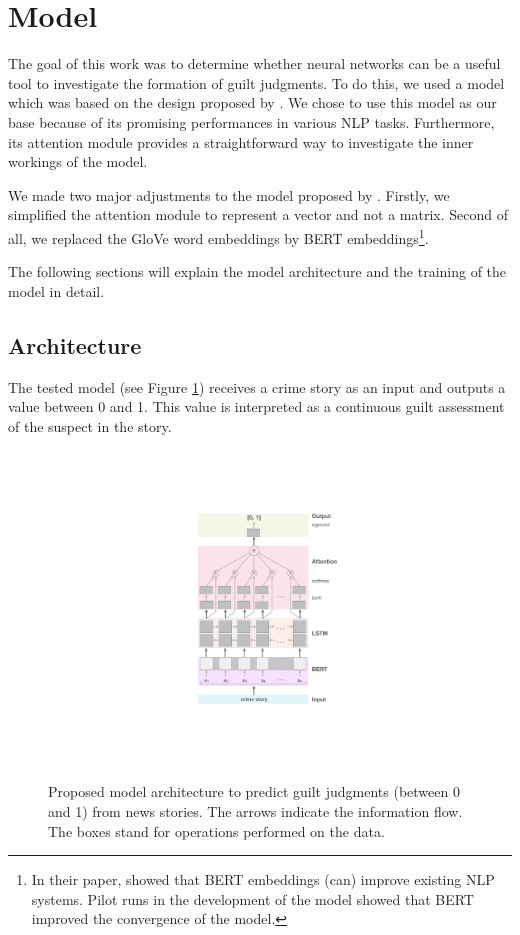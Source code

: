 \documentclass[11pt,a4paper]{article}
\begin{document}
\section{Model}

The goal of this work was to determine whether neural networks can be a useful tool to investigate the formation of guilt judgments. To do this, we used a model which was based on the design proposed by \citeauthor{Lin:2017}. We chose to use this model as our base because of its promising performances in various NLP tasks. Furthermore, its attention module provides a straightforward way to investigate the inner workings of the model. 

We made two major adjustments to the model proposed by \citeauthor{Lin:2017}. Firstly, we simplified the attention module to represent a vector and not a matrix. Second of all, we replaced the GloVe word embeddings by BERT embeddings\footnote{In their paper, \citeauthor{Devlin:2018} showed that BERT embeddings (can) improve existing NLP systems. Pilot runs in the development of the model showed that BERT improved the convergence of the model.}.

The following sections will explain the model architecture and the training of the model in detail.

\subsection{Architecture}
\label{model-architecture}
The tested model (see Figure \ref{fig:model}) receives a crime story as an input and outputs a value between 0 and 1. This value is interpreted as a continuous guilt assessment of the suspect in the story.

\begin{figure}
	\includegraphics[width=\linewidth]{graphs/model.pdf}
	\caption{Proposed model architecture to predict guilt judgments (between 0 and 1) from news stories. The arrows indicate the information flow. The boxes stand for operations performed on the data.}
	\label{fig:model}
\end{figure}
\end{document}
